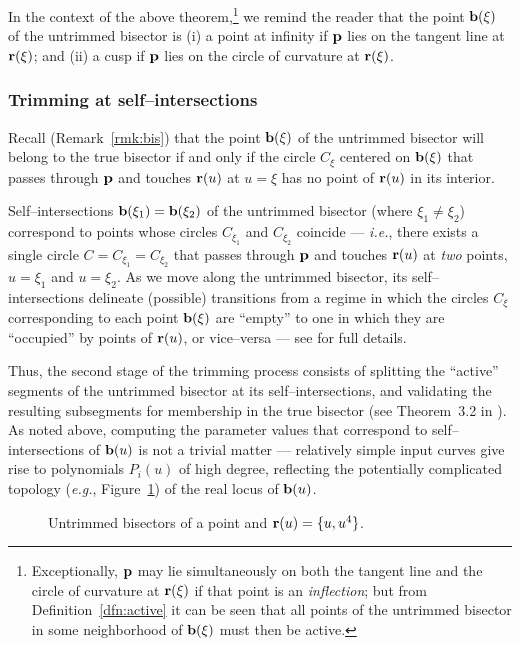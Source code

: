 In the context of the above theorem,\footnote{Exceptionally,
${\bf p}$ may lie simultaneously on both the tangent line and
the circle of curvature at ${\bf r}(\xi)$ if that point is an
{\it inflection}; but from Definition~\ref{dfn:active} it can
be seen that all points of the untrimmed bisector in some
neighborhood of ${\bf b}(\xi)$ must then be active.}
we remind the reader that
the point ${\bf b}(\xi)$ of the untrimmed bisector is (i) a point
at infinity if ${\bf p}$ lies on the tangent line at ${\bf r}(\xi)$;
and (ii) a cusp if ${\bf p}$ lies on the circle of curvature at
${\bf r}(\xi)$.

\subsubsection{Trimming at self--intersections}
\label{sec:critical}

Recall (Remark~\ref{rmk:bis}) that the point ${\bf b}(\xi)$ of
the untrimmed bisector will belong to the true bisector if and
only if the circle $C_\xi$ centered on ${\bf b}(\xi)$ that passes
through ${\bf p}$ and touches ${\bf r}(u)$ at $u=\xi$ has no point
of ${\bf r}(u)$ in its interior.

Self--intersections ${\bf b}(\xi_1)={\bf b}(\xi_2)$ of the
untrimmed bisector (where $\xi_1\not=\xi_2$) correspond to points
whose circles $C_{\xi_1}$ and $C_{\xi_2}$ coincide --- {\it i.e.},
there exists a single circle $C=C_{\xi_1}=C_{\xi_2}$ that passes
through ${\bf p}$ and touches ${\bf r}(u)$ at {\it two\/} points,
$u=\xi_1$ and $u=\xi_2$. As we move along the untrimmed bisector,
its self--intersections delineate (possible) transitions from a
regime in which the circles $C_\xi$ corresponding to each point
${\bf b}(\xi)$ are ``empty'' to one in which they are ``occupied''
by points of ${\bf r}(u)$, or vice--versa --- see \cite{farouki91}
for full details.

Thus, the second stage of the trimming process consists of
splitting the ``active'' segments of the untrimmed bisector at
its self--intersections, and validating the resulting subsegments
for membership in the true bisector (see Theorem~3.2 in \cite
{farouki91}). As noted above, computing the parameter values
that correspond to self--intersections of ${\bf b}(u)$ is not
a trivial matter --- relatively simple input curves give rise to
polynomials $P_i(u)$ of high degree, reflecting the potentially
complicated topology ({\it e.g.}, Figure~\ref{fig:sprbla}) of
the real locus of ${\bf b}(u)$.

\begin{figure}[htbp] \vspace{3.6in}
\caption[]{Untrimmed bisectors of a point and ${\bf r}(u)=\{u,u^4\}$.}
\label{fig:sprbla} \end{figure}


